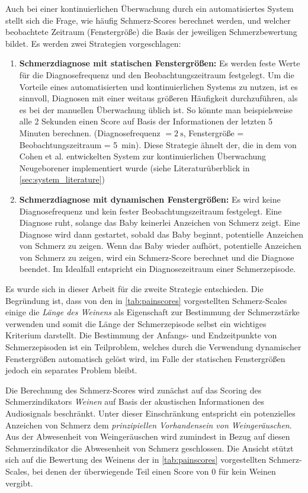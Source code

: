 Auch bei einer kontinuierlichen Überwachung durch ein automatisiertes System stellt sich die Frage, wie häufig Schmerz-Scores berechnet werden, und welcher beobachtete Zeitraum (\glqq Fenstergröße\grqq ) die Basis der jeweiligen Schmerzbewertung bildet. Es werden zwei Strategien vorgeschlagen:
\begin{enumerate}
\item \textbf{Schmerzdiagnose mit statischen Fenstergrößen: } Es werden feste Werte für die Diagnosefrequenz und den Beobachtungszeitraum festgelegt. Um die Vorteile eines automatisierten und kontinuierlichen Systems zu nutzen, ist es sinnvoll, Diagnosen mit einer weitaus größeren Häufigkeit durchzuführen, als es bei der manuellen Überwachung üblich ist. So könnte man beispielsweise alle 2 Sekunden einen Score auf Basis der Informationen der letzten 5 Minuten berechnen. (Diagnosefrequenz $ = \SI{2}{\second}$, Fenstergröße = Beobachtungszeitraum = \SI{5}{\minute}). Diese Strategie ähnelt der, die in dem von Cohen et al. \cite{cohenCry} entwickelten System zur kontinuierlichen Überwachung Neugeborener implementiert wurde (siehe Literaturüberblick in \autoref{sec:system_literature})
\item \textbf{Schmerzdiagnose mit dynamischen Fenstergrößen: } Es wird keine Diagnosefrequenz und kein fester Beobachtungszeitraum festgelegt. Eine Diagnose ruht, solange das Baby keinerlei Anzeichen von Schmerz zeigt. Eine Diagnose wird dann gestartet, sobald das Baby beginnt, potentielle Anzeichen von Schmerz zu zeigen. Wenn das Baby wieder aufhört, potentielle Anzeichen von Schmerz zu zeigen, wird ein Schmerz-Score berechnet und die Diagnose beendet. Im Idealfall entspricht ein Diagnosezeitraum einer Schmerzepisode.
\end{enumerate}

Es wurde sich in dieser Arbeit für die zweite Strategie entschieden. Die Begründung ist, dass von den in \autoref{tab:painscores} vorgestellten Schmerz-Scales einige die \emph{Länge des Weinens} als Eigenschaft zur Bestimmung der Schmerzstärke verwenden und somit die Länge der Schmerzepisode selbst ein wichtiges Kriterium darstellt. Die Bestimmung der Anfangs- und Endzeitpunkte von Schmerzepisoden ist ein Teilproblem, welches durch die Verwendung dynamischer Fenstergrößen automatisch gelöst wird, im Falle der statischen Fenstergrößen jedoch ein separates Problem bleibt. 

Die Berechnung des Schmerz-Scores wird zunächst auf das Scoring des Schmerzindikators \emph{Weinen} auf Basis der akustischen Informationen des Audiosignals beschränkt. Unter dieser Einschränkung entspricht ein \glqq potenzielles Anzeichen von Schmerz\grqq{} dem \emph{prinzipiellen Vorhandensein von Weingeräuschen}. Aus der Abwesenheit von Weingeräuschen wird zumindest in Bezug auf diesen Schmerzindikator die Abwesenheit von Schmerz geschlossen. Die Ansicht stützt sich auf die Bewertung des Weinens der in \autoref{tab:painscores} vorgestellten Schmerz-Scales, bei denen der überwiegende Teil einen Score von 0 für \glqq kein Weinen\grqq{} vergibt.

